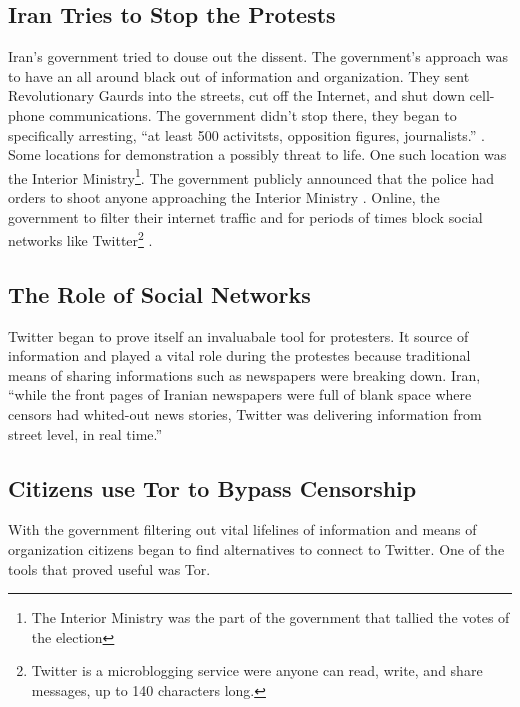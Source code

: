 \documentclass[11pt]{article}
\begin{document}
\begin{multicols}{2}
\subsection{Iran Tries to Stop the Protests}

Iran's government tried to douse out the dissent. The government's approach was
to have an all around black out of information and organization. They sent
Revolutionary Gaurds into the streets, cut off the Internet, and shut down
cell-phone communications\cite{TheIranianVote}. The government didn't stop
there, they began to specifically arresting, ``at least 500 activitsts,
opposition figures, journalists.'' \cite{IranProtestsFifthDayOfUnrest}.  Some
locations for demonstration a possibly threat to life.  One such location was
the Interior Ministry\footnote{The Interior Ministry was the part of the
government that tallied the votes of the election}. The government publicly
announced that the police had orders to shoot anyone approaching the Interior
Ministry \cite{TheIranianVote}. Online, the government to filter their internet
traffic and for periods of times block social networks like
Twitter\footnote{Twitter is a microblogging service were anyone can read, write,
and share messages, up to 140 characters long.\cite{WhatIsTwitter}}
\cite{IranBlocksFacebookTwitter}.

\subsection{The Role of Social Networks}

Twitter began to prove itself an invaluabale tool for protesters. It source of
information and played a vital role during the protestes because traditional
means of sharing informations such as newspapers were breaking down. Iran,
``while the front pages of Iranian newspapers were full of blank space where
censors had whited-out news stories, Twitter was delivering information from
street level, in real time.''\cite{WhyTwitterIsTheMedium}

\subsection{Citizens use Tor to Bypass Censorship}

With the government filtering out vital lifelines of information and means of
organization citizens began to find alternatives to connect to Twitter. One of
the tools that proved useful was Tor.


\end{multicols}
\end{document}
